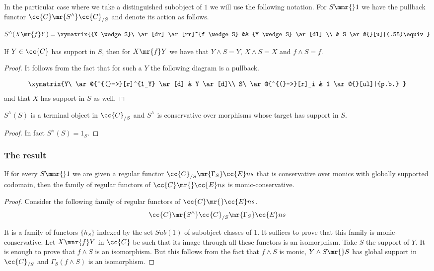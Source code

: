 In the particular case where we take a distinguished subobject of $1$ we will use the following notation. For $S \mmr{} 1$ we have the pullback functor $\cc{C} \mr{S^{\wedge}} \cc{C}_{/S}$ and denote its action as follows.

\[
S^{\wedge}(X \mr{f} Y)=\xymatrix{{X \wedge S}\  \ar[dr] \ar[rr]^{f \wedge S} && {Y \wedge S} \ar[dl]
\\
	&				S  \ar@{}[u]|(.55)\equiv}
\]

\begin{lemma}\label{sigma con soporte en S }
If $Y \in \cc{C}$ has support in $S$, then for $X \mr{f} Y$ we have that $Y \wedge S=Y$, $X \wedge S=X$ and $f \wedge S=f$. 
\end{lemma}

\begin{proof}
It follows from the fact that for such a $Y$ the following diagram is a pullback.

\[
\xymatrix{Y\ \ar@{^{(}->}[r]^{1_Y} \ar[d] & Y \ar[d]\\ S\ \ar@{^{(}->}[r]_i & 1 \ar@{}[ul]|{p.b.} }
\]
and that $X$ has support in $S$ as well.
\end{proof}

\begin{corollary}
 $S^{\wedge}(S)$  is a terminal object in $\cc{C}_{/S}$ and $S^{\wedge}$ is conservative over morphisms whose target has support in  $S$.
\end{corollary}

\begin{proof}
In fact $S^{\wedge}(S)=1_S$.
\end{proof}


\subsubsection{The result}

\begin{theorem}
If for every $S \mmr{} 1 $ we are given a regular functor $\cc{C}_{/S} \mr{\Gamma_{S}} \cc{E}ns$ that is conservative over monics with globally supported codomain, then the family of regular functors of $\cc{C} \mr{} \cc{E}ns$ is monic-conservative.
\end{theorem}

\begin{proof}
Consider the following family  of regular functors of $\cc{C} \mr{} \cc{E}ns$.
\[
\cc{C} \mr{S^{\wedge}} \cc{C}_{/S} \mr{\Gamma_{S}} \cc{E}ns
\]


It is a family of functors $\{h_S\}$ indexed by the set $Sub(1)$ of subobject classes of 1. It suffices to prove that this family is monic-conservative. Let $X \mnr{f} Y$ in $\cc{C}$  be such that its image through all these functors is an isomorphism. Take $S$ the support of $Y$. It is enough to prove that $f \wedge S$ is an isomorphism. But this follows from the fact that $f \wedge S$ is monic, $Y \wedge S \mr{} S$ has global support in  $\cc{C}_{/S}$ and $\Gamma_{S}(f \wedge S)$ is an isomorphism.
\end{proof}


